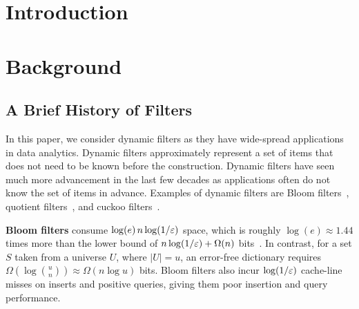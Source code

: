 
\section{Introduction}
\label{intro}



\section{Background}

\subsection{A Brief History of Filters}\label{sec:prelim}

%
%

In this paper, we consider dynamic filters as they have wide-spread applications in data analytics.
Dynamic filters approximately represent a set of items that does not need to be known before the construction. Dynamic filters have seen much more advancement in the last few decades as applications often do not know the set of items in advance. Examples of dynamic filters are Bloom filters~\cite{Bloom70}, quotient filters~\cite{BenderFaJo12, PandeyBJP17b,DillingerMa09,PaghPaRa05,EinzigerFr16}, and cuckoo filters~\cite{FanAnKa14,BreslowJ18}.

\textbf{Bloom filters} consume $\log(e)\, n\log (1/\varepsilon)$ space, which is roughly $\log(e)\approx 1.44$ times more than the lower bound of $n\log (1/\varepsilon) + \Omega(n)$ bits~\cite{CarterFG78}. In contrast, for a set $S$ taken from a universe $U$, where $|U|=u$, an error-free dictionary requires $\Omega(\log {u\choose n}) \approx \Omega(n \log u)$ bits. Bloom filters also incur $\log (1/\varepsilon)$ cache-line misses on inserts and positive queries, giving them poor insertion and query performance. 




